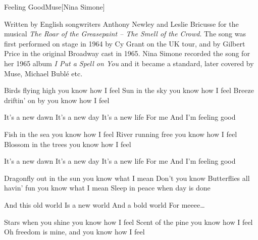 \begin{Song}{Feeling Good}{Muse}[Nina Simone]

\begin{Paratext}
Written by English songwriters Anthony Newley and Leslie Bricusse for the musical \emph{The Roar of the Greasepaint – The Smell of the Crowd}. The song was first performed on stage in 1964 by Cy Grant on the UK tour, and by Gilbert Price in the original Broadway cast in 1965. Nina Simone recorded the song for her 1965 album \emph{I Put a Spell on You} and it became a standard, later covered by Muse, Michael Bublé etc.
\end{Paratext}

\begin{multicols}{2}

\begin{Verse}
Birds flying high you know how I feel
Sun in the sky you know how I feel
Breeze driftin' on by you know how I feel
\end{Verse}
\espaceInterStrophe

\begin{Chorus}
It's a new dawn
It's a new day
It's a new life
For me
And I'm feeling good
\end{Chorus}
\espaceInterStrophe

\begin{Verse}
Fish in the sea you know how I feel
River running free you know how I feel
Blossom in the trees you know how I feel
\end{Verse}
\espaceInterStrophe

\begin{Chorus}
It's a new dawn
It's a new day
It's a new life
For me
And I'm feeling good
\end{Chorus}
\vfill
\columnbreak

\begin{Verse}
Dragonfly out in the sun you know what I mean
Don't you know
Butterflies all havin' fun you know what I mean
Sleep in peace when day is done
\end{Verse}
\espaceInterStrophe

\begin{Chorus}
And this old world
Is a new world
And a bold world
For meeee\dots
\end{Chorus}
\espaceInterStrophe

\begin{Verse}
Stars when you shine you know how I feel
Scent of the pine you know how I feel
Oh freedom is mine, and you know how I feel
\end{Verse}
\espaceInterStrophe


\end{multicols}
\end{Song}
